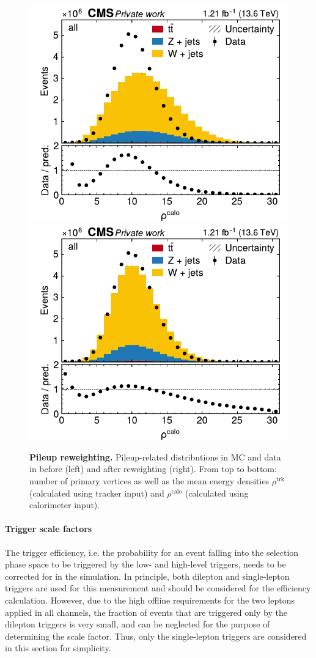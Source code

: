 \begin{figure}[p]
    \includegraphics[width=0.49 \textwidth]{figures/ttxs/pileup/rhoFastjetCentralCalo_orig.pdf}
    \hfill
    \includegraphics[width=0.49 \textwidth]{figures/ttxs/pileup/rhoFastjetCentralCalo_reweighted.pdf}
    \caption{\textbf{Pileup reweighting.} Pileup-related distributions in MC and data in before (left) and after reweighting (right). From top to bottom: number of primary vertices as well as the mean energy densities $\rho^{\mathrm{trk}}$ (calculated using tracker input) and $\rho^{\mathrm{calo}}$ (calculated using calorimeter input).}
    \label{fig:ttxs:pileup}
  \end{figure}

\paragraph{Trigger scale factors}

The trigger efficiency, i.e. the probability for an event falling into the selection phase space to be triggered by the low- and high-level triggers, needs to be corrected for in the simulation.
In principle, both dilepton and single-lepton triggers are used for this measurement and should be considered for the efficiency calculation. However, due to the high offline \pt requirements for the two leptons applied in all channels, the fraction of events that are triggered only by the dilepton triggers is very small, and can be neglected for the purpose of determining the scale factor. Thus, only the single-lepton triggers are considered in this section for simplicity.

